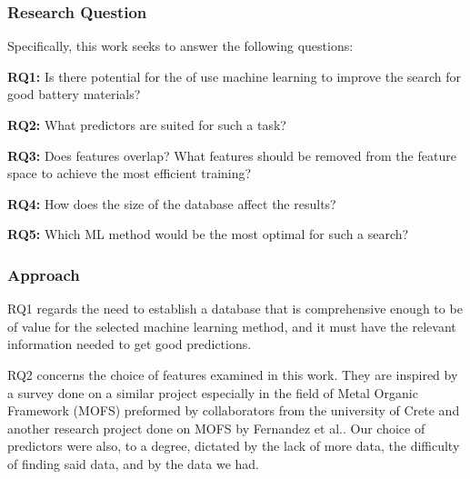 

\subsubsection{Research Question} \label{sec:RQ}

Specifically, this work seeks to answer the following questions: 

\textbf{\ac{RQ}1:} Is there potential for the of use machine learning to improve the search for good battery materials?

\textbf{RQ2:} What predictors are suited for such a task?

\textbf{RQ3:} Does features overlap? What features should be removed from the feature space to achieve the most efficient training?

\textbf{RQ4:} How does the size of the database affect the results?

\textbf{RQ5:} Which ML method would be the most optimal for such a search?


\subsubsection{Approach}

RQ1 regards the need to establish a database that is comprehensive enough to be of value for the selected machine learning method, and it must have the relevant information needed to get good predictions.

RQ2 concerns the choice of features examined in this work. They are inspired by a survey done on a similar project especially in the field of Metal Organic Framework (\ac{MOFS}) preformed by collaborators from the university of Crete \cite{fanourgakis2019robust} \cite{fanourgakis2020universal} and another research project done on MOFS by Fernandez et al.\cite{fernandez2013atomic}. Our choice of predictors were also, to a degree, dictated by the lack of more data, the difficulty of finding said data, and by the data we had. 

